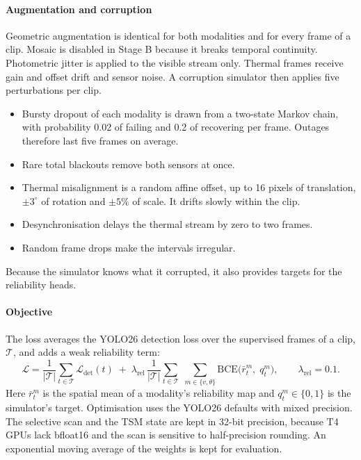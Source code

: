 \paragraph{Augmentation and corruption}
Geometric augmentation is identical for both modalities and for every frame
of a clip. Mosaic is disabled in Stage B because it breaks temporal
continuity. Photometric jitter is applied to the visible stream only.
Thermal frames receive gain and offset drift and sensor noise. A corruption
simulator then applies five perturbations per clip.
\begin{itemize}
  \item Bursty dropout of each modality is drawn from a two-state Markov
        chain, with probability 0.02 of failing and 0.2 of recovering per
        frame. Outages therefore last five frames on average.
  \item Rare total blackouts remove both sensors at once.
  \item Thermal misalignment is a random affine offset, up to 16 pixels of
        translation, $\pm3^\circ$ of rotation and $\pm5\%$ of scale. It
        drifts slowly within the clip.
  \item Desynchronisation delays the thermal stream by zero to two frames.
  \item Random frame drops make the intervals irregular.
\end{itemize}
Because the simulator knows what it corrupted, it also provides targets for
the reliability heads.

\paragraph{Objective}
The loss averages the YOLO26 detection loss over the supervised frames of a
clip, $\mathcal{T}$, and adds a weak reliability term:
\begin{equation}
  \mathcal{L} = \frac{1}{|\mathcal{T}|}\sum_{t\in\mathcal{T}} \mathcal{L}_{\text{det}}(t)
  \;+\; \lambda_{\text{rel}}\,\frac{1}{|\mathcal{T}|}\sum_{t\in\mathcal{T}}\;\sum_{m\in\{v,\theta\}}
  \mathrm{BCE}\bigl(\bar r^m_t,\; q^m_t\bigr),
  \qquad \lambda_{\text{rel}} = 0.1 .
  \label{eq:loss}
\end{equation}
Here $\bar r^m_t$ is the spatial mean of a modality's reliability map and
$q^m_t\in\{0,1\}$ is the simulator's target. Optimisation uses the YOLO26
defaults with mixed precision. The selective scan and the TSM state are kept
in 32-bit precision, because T4 GPUs lack bfloat16 and the scan is sensitive
to half-precision rounding. An exponential moving average of the weights is
kept for evaluation.

